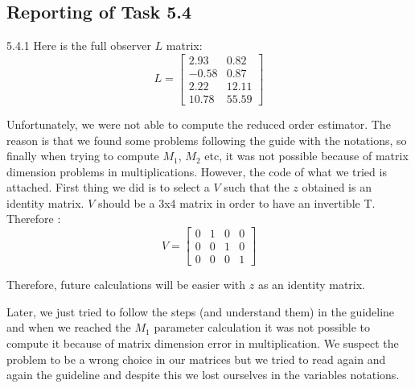 \documentclass[11pt]{article}
\begin{document}
\subsection*{Reporting of Task 5.4}

5.4.1 Here is the full observer $L$ matrix:
\begin{equation*}
L=
\begin{bmatrix}
2.93 & 0.82 \\
-0.58 & 0.87 \\
2.22 & 12.11 \\
10.78 & 55.59
\end{bmatrix}
\end{equation*}

Unfortunately, we were not able to compute the reduced order estimator.
The reason is that we found some problems following the guide with the notations, so finally when trying to compute $M_1$, $M_2$ etc, it was not possible because of matrix dimension problems in multiplications.
However, the code of what we tried is attached.
First thing we did is to select a $V$ such that the $z$ obtained is an identity matrix. $V$ should be a 3x4 matrix in order to have an invertible T. Therefore :
\begin{equation*}
V=
\begin{bmatrix}
0 & 1 & 0 & 0 \\
0 & 0 & 1 & 0 \\
0 & 0 & 0 & 1
\end{bmatrix}
\end{equation*}

Therefore, future calculations will be easier with $z$ as an identity matrix.

Later, we just tried to follow the steps (and understand them) in the guideline and when we reached the $M_1$ parameter calculation it was not possible to compute it because of matrix dimension error in multiplication. We suspect the problem to be a wrong choice in our matrices but we tried to read again and again the guideline and despite this we lost ourselves in the variables notations.
\end{document}
